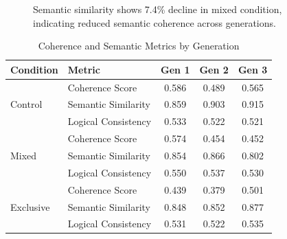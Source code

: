\documentclass{article}
\begin{document}
\begin{figure}[H]
\centering
{}
\caption{Semantic similarity shows 7.4\% decline in mixed condition, indicating reduced semantic coherence across generations.}
\label{fig:semantic_similarity}
\end{figure}

\begin{table}[H]
\centering
\caption{Coherence and Semantic Metrics by Generation}
\label{tab:coherence_metrics}
\begin{tabular}{llccc}
\toprule
\textbf{Condition} & \textbf{Metric} & \textbf{Gen 1} & \textbf{Gen 2} & \textbf{Gen 3} \\
\midrule
\multirow{3}{*}{Control} & Coherence Score & 0.586 & 0.489 & 0.565 \\
 & Semantic Similarity & 0.859 & 0.903 & 0.915 \\
 & Logical Consistency & 0.533 & 0.522 & 0.521 \\
\midrule
\multirow{3}{*}{Mixed} & Coherence Score & 0.574 & 0.454 & 0.452 \\
 & Semantic Similarity & 0.854 & 0.866 & 0.802 \\
 & Logical Consistency & 0.550 & 0.537 & 0.530 \\
\midrule
\multirow{3}{*}{Exclusive} & Coherence Score & 0.439 & 0.379 & 0.501 \\
 & Semantic Similarity & 0.848 & 0.852 & 0.877 \\
 & Logical Consistency & 0.531 & 0.522 & 0.535 \\
\bottomrule
\end{tabular}
\end{table}
\end{document}
